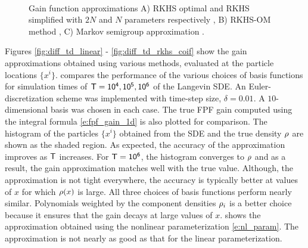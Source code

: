 \begin{figure}[htbp]
	\centering
\mbox{
		     \qquad
		     \qquad
		}
	\caption[$\gradTD$-RKHS-OM performance with $N$ and $d$]{Gain function approximations A) RKHS optimal and RKHS simplified with $2N$ and $N$ parameters respectively \cite{radmey18a}, B) RKHS-OM method \cite{radmey19}, C) Markov semigroup approximation \cite{tagmeh16}.}
	\label{fig:diff_td_rkhs_coif_d2510}
\end{figure}

Figures \ref{fig:diff_td_linear} - \ref{fig:diff_td_rkhs_coif} show the gain approximations obtained using various methods, evaluated at the particle locations $\{x^i\}$.  compares the performance of the various choices of basis functions for simulation times of $\sf T = 10^4, 10^5, 10^6$ of the Langevin SDE. An Euler-discretization scheme was implemented with time-step size, $\delta = 0.01$. A $10$-dimensional basis was chosen in each case. The true FPF gain computed using the integral formula \eqref{e:fpf_gain_1d} is also plotted for comparison. The histogram of the particles $\{x^i\}$ obtained from the SDE and the true density $\rho$ are shown as the shaded region. As expected, the accuracy of the approximation improves as $\sf T$ increases. For $\sf T=10^6$, the histogram converges to $\rho$ and as a result, the gain approximation matches well with the true value. Although, the approximation is not tight everywhere, the accuracy is typically better at values of $x$ for which $\rho(x)$ is large. All three choices of basis functions perform nearly similar. Polynomials weighted by the component densities $\rho_i$ is a better choice because it ensures that the gain decays at large values of $x$.  shows the approximation obtained using the nonlinear parameterization \eqref{e:nl_param}. The approximation is not nearly as good as that for the linear parameterization.

